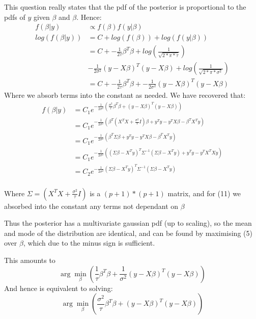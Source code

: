 This question really states that the pdf of the posterior is proportional to the pdfs of $y$ given $\beta$ and $\beta$.
Hence:
\begin{align}
    f(\beta\vert y) &\propto f(\beta) f(y\vert \beta) \\
    log(f(\beta\vert y)) &= C + log(f(\beta)) + log(f(y\vert \beta)) \\
     &= C + -\frac{1}{2\tau}\beta^T \beta + log\left(\frac{1}{\sqrt{2*\pi*\tau}}\right)\\ &-\frac{1}{2\sigma^2}\left(y - X\beta\right) ^T \left(y - X\beta\right)  +   log\left(\frac{1}{\sqrt{2*\pi*\sigma^2}}\right) \\ 
     &= C + -\frac{1}{2\tau}\beta^T \beta  +  -\frac{1}{2\sigma^2}\left(y - X\beta\right) ^T \left(y - X\beta\right)
\end{align}
Where we absorb terms into the constant as needed. 
We have recovered that: 
\begin{align}
    f(\beta \vert y) &= C_1e^{ -\frac{1}{2\sigma^2}\left(\frac{\sigma^2}{\tau} \beta^T \beta  +\left(y - X\beta\right) ^T \left(y - X\beta\right)\right)} \\
    &= C_1e^{ -\frac{1}{2\sigma^2}\left(\beta^T\left(X^T X + \frac{\sigma^2}{\tau} I \right) \beta + y^T y - y^T X \beta - \beta^T X^T y\right)}\\
    &= C_1e^{ -\frac{1}{2\sigma^2}\left(\beta^T \Sigma  \beta + y^T y - y^T X \beta - \beta^T X^T y\right)}\\
    &= C_1e^{ -\frac{1}{2\sigma^2}\left(\left(\Sigma\beta - X^T y\right)^T\Sigma^{-1}   \left(\Sigma\beta - X^T y\right) + y^T y - y^T X^T X y\right)}\\
    &= C_2e^{ -\frac{1}{2\sigma^2}\left(\Sigma\beta - X^T y\right)^T\Sigma^{-1}   \left(\Sigma\beta - X^T y\right)}\\
\end{align}

Where $\Sigma = \left(X^T X + \frac{\sigma^2}{\tau} I \right)$ is a $(p+1) * (p+1)$ matrix, and for (11) we absorbed into the constant any terms not dependant on $\beta$
 
Thus the posterior has a multivariate gaussian pdf (up to scaling), so the mean and mode of the distribution are identical, and can be found by maximising (5) over $\beta$, which due to the minus sign is sufficient.

This amounts to
$$\arg\min_\beta \left( \frac{1}{\tau}\beta^T \beta  +  \frac{1}{\sigma^2}\left(y - X\beta\right) ^T \left(y - X\beta\right)\right)$$ 
And hence is equivalent to solving:
$$\arg\min_\beta  \left(\frac{\sigma^2}{\tau}\beta^T \beta  + \left(y - X\beta\right) ^T \left(y - X\beta\right)\right)$$

